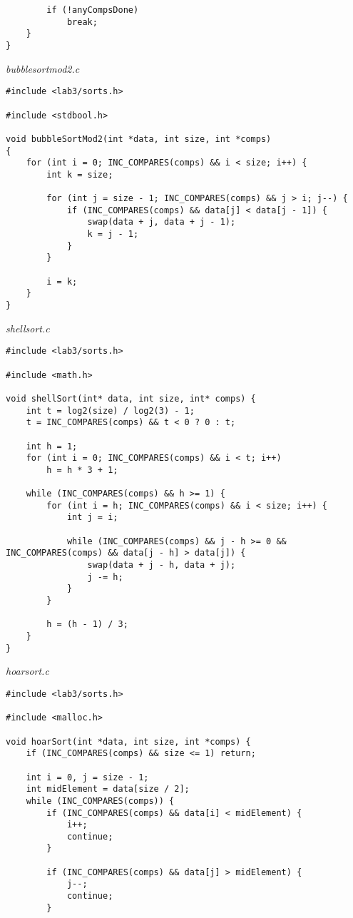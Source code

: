 \documentclass[a4paper,14pt]{extarticle}
\begin{document}
\begin{enumerate}
\begin{verbatim}
        if (!anyCompsDone)
            break;
    }
}
	\end{verbatim}
	      \textit{bubblesortmod2.c}
	      \begin{verbatim}
#include <lab3/sorts.h>

#include <stdbool.h>

void bubbleSortMod2(int *data, int size, int *comps)
{
    for (int i = 0; INC_COMPARES(comps) && i < size; i++) {
        int k = size;

        for (int j = size - 1; INC_COMPARES(comps) && j > i; j--) {
            if (INC_COMPARES(comps) && data[j] < data[j - 1]) {
                swap(data + j, data + j - 1);
                k = j - 1;
            }
        }

        i = k;
    }
}
	\end{verbatim}
	      \textit{shellsort.c}
	      \begin{verbatim}
#include <lab3/sorts.h>

#include <math.h>

void shellSort(int* data, int size, int* comps) {
    int t = log2(size) / log2(3) - 1;
    t = INC_COMPARES(comps) && t < 0 ? 0 : t;

    int h = 1;
    for (int i = 0; INC_COMPARES(comps) && i < t; i++) 
        h = h * 3 + 1;

    while (INC_COMPARES(comps) && h >= 1) {
        for (int i = h; INC_COMPARES(comps) && i < size; i++) {
            int j = i;
            
            while (INC_COMPARES(comps) && j - h >= 0 && INC_COMPARES(comps) && data[j - h] > data[j]) {
                swap(data + j - h, data + j);
                j -= h;
            }
        }

        h = (h - 1) / 3;
    }
}
	\end{verbatim}
	      \textit{hoarsort.c}
	      \begin{verbatim}
#include <lab3/sorts.h>

#include <malloc.h>

void hoarSort(int *data, int size, int *comps) {
    if (INC_COMPARES(comps) && size <= 1) return;

    int i = 0, j = size - 1;
    int midElement = data[size / 2];
    while (INC_COMPARES(comps)) {
        if (INC_COMPARES(comps) && data[i] < midElement) {
            i++;
            continue;
        }

        if (INC_COMPARES(comps) && data[j] > midElement) {
            j--;
            continue;
        }


\end{verbatim}
\end{enumerate}
\end{document}
